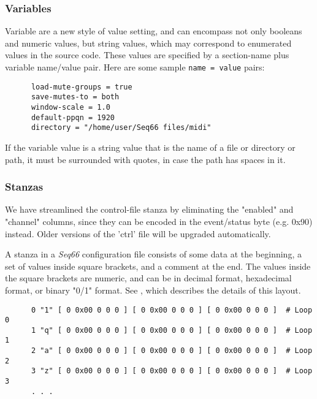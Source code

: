 \subsubsection{Variables}
\label{subsec:configuration_common_variables}

   Variable are a new style of value setting, and can encompass not only
   booleans and numeric values, but string values, which may correspond to
   enumerated values in the source code.  These values are specified by a
   section-name plus variable name/value pair.  Here are some sample
   \texttt{name = value} pairs:

   \begin{verbatim}
      load-mute-groups = true
      save-mutes-to = both
      window-scale = 1.0
      default-ppqn = 1920
      directory = "/home/user/Seq66 files/midi"
   \end{verbatim}

   If the variable value is a string value that is the name of a file or
   directory or path, it must be surrounded with quotes, in case the path has
   spaces in it.

\subsubsection{Stanzas}
\label{subsec:configuration_common_stanzas}

   We have streamlined the control-file stanza by eliminating the "enabled" and
   "channel" columns, since they can be encoded in the event/status
   byte (e.g. 0x90) instead.  Older versions of the 'ctrl' file will be
   upgraded automatically.

   A stanza in a \textsl{Seq66} configuration file consists of some data at the
   beginning, a set of values inside square brackets, and a comment
   at the end.  The values inside the square brackets are numeric, and can
   be in decimal format, hexadecimal format, or binary "0/1" format.
   See , which describes
   the details of this layout.

   \begin{verbatim}
      0 "1" [ 0 0x00 0 0 0 ] [ 0 0x00 0 0 0 ] [ 0 0x00 0 0 0 ]  # Loop 0
      1 "q" [ 0 0x00 0 0 0 ] [ 0 0x00 0 0 0 ] [ 0 0x00 0 0 0 ]  # Loop 1
      2 "a" [ 0 0x00 0 0 0 ] [ 0 0x00 0 0 0 ] [ 0 0x00 0 0 0 ]  # Loop 2
      3 "z" [ 0 0x00 0 0 0 ] [ 0 0x00 0 0 0 ] [ 0 0x00 0 0 0 ]  # Loop 3
      . . .
   \end{verbatim}


